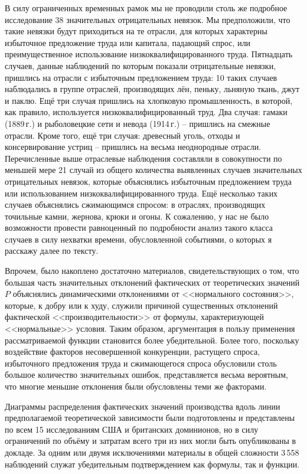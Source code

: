 \documentclass{article}
\begin{document}
В силу ограниченных временных рамок мы не проводили столь же подробное исследование 38 значительных отрицательных невязок. Мы предположили, что такие невязки будут приходиться на те отрасли, для которых характерны избыточное предложение труда или капитала, падающий спрос, или преимущественное использование низкоквалифицированного труда. Пятнадцать случаев, данные наблюдений по которым показали отрицательные невязки, пришлись на отрасли с избыточным предложением труда: 10 таких случаев наблюдались в группе отраслей, производящих лён, пеньку, льняную ткань, джут и паклю. Ещё три случая пришлись на хлопковую промышленность, в которой, как правило, используется низкоквалифицированный труд. Два случая: гамаки (1889\,г.) и рыболовецкие сети и невода (1914\,г.) -- пришлись на смежные отрасли. Кроме того, ещё три случая: древесный уголь, отходы и консервирование устриц -- пришлись на весьма неоднородные отрасли. Перечисленные выше отраслевые наблюдения составляли в совокупности по меньшей мере 21 случай из общего количества выявленных случаев значительных отрицательных невязок, которые объяснялись избыточным предложением труда или использованием низкоквалифицированного труда. Ещё несколько таких случаев объяснялись сжимающимся спросом: в отраслях, производящих точильные камни, жернова, крюки и огоны. К сожалению, у нас не было возможности провести равноценный по подробности анализ такого класса случаев в силу нехватки времени, обусловленной событиями, о которых я расскажу далее по тексту.

Впрочем, было накоплено достаточно материалов, свидетельствующих о том, что большая часть значительных отклонений фактических от теоретических значений \(P\) объяснялись динамическими отклонениями от <<нормального состояния>>, которые, к добру или к худу, служили причиной существенных отклонений фактической <<производительности>> от формулы, характеризующей <<нормальные>> условия. Таким образом, аргументация в пользу применения рассматриваемой функции становится более убедительной. Более того, поскольку воздействие факторов несовершенной конкуренции, растущего спроса, избыточного предложения труда и сжимающегося спроса обусловили столь большое количество значительных ошибок, представляется весьма вероятным, что многие меньшие отклонения были обусловлены теми же факторами.

Диаграммы распределения фактических значений производства вдоль линии предполагаемой теоретической зависимости были подготовлены и представлены по всем 15 исследованиям США и британских доминионов, но в силу ограничений по объёму и затратам всего три из них могли быть опубликованы в докладе. За одним или двумя исключениями материалы в общей сложности 3\,558 наблюдений служат убедительным подтверждением как формулы, так и функции.
\end{document}
